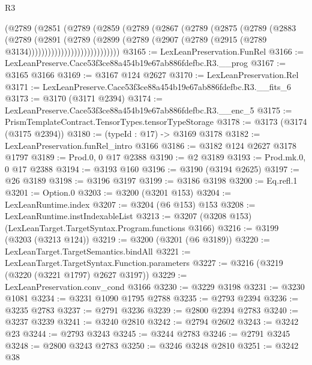 \begin{lexlean}{R3}
\begin{coremodule}
                      (@2789
                        (@2851
                          (@2789
                            (@2859
                              (@2789
                                (@2867
                                  (@2789
                                    (@2875
                                      (@2789
                                        (@2883
                                          (@2789
                                            (@2891
                                              (@2789
                                                (@2899
                                                  (@2789
                                                    (@2907
                                                      (@2789
                                                        (@2915
                                                          (@2789 @3134))))))))))))))))))))))))))))
@3165 := LexLeanPreservation.FunRel
@3166 := LexLeanPreserve.Cace53f3ce88a454b19e67ab886fdefbc.R3.__prog
@3167 := @3165 @3166
@3169 := @3167 @124 @2627
@3170 := LexLeanPreservation.Rel
@3171 := LexLeanPreserve.Cace53f3ce88a454b19e67ab886fdefbc.R3.__fits_6
@3173 := @3170 (@3171 @2394)
@3174 := LexLeanPreserve.Cace53f3ce88a454b19e67ab886fdefbc.R3.__enc_5
@3175 := PrismTemplateContract.TensorTypes.tensorTypeStorage
@3178 := @3173 (@3174 (@3175 @2394))
@3180 := (typeId : @17) -> @3169 @3178
@3182 := LexLeanPreservation.funRel_intro @3166
@3186 := @3182 @124 @2627 @3178 @1797
@3189 := Prod.{0, 0} @17 @2388
@3190 := @2 @3189
@3193 := Prod.mk.{0, 0} @17 @2388
@3194 := @3193 @160
@3196 := @3190 (@3194 @2625)
@3197 := @26 @3189
@3198 := @3196 @3197
@3199 := @3186 @3198
@3200 := Eq.refl.{1}
@3201 := Option.{0}
@3203 := @3200 (@3201 @153)
@3204 := LexLeanRuntime.index
@3207 := @3204 (@6 @153) @153
@3208 := LexLeanRuntime.instIndexableList
@3213 := @3207 (@3208 @153) (LexLeanTarget.TargetSyntax.Program.functions @3166)
@3216 := @3199 (@3203 (@3213 @124))
@3219 := @3200 (@3201 (@6 @3189))
@3220 := LexLeanTarget.TargetSemantics.bindAll
@3221 := LexLeanTarget.TargetSyntax.Function.parameters
@3227 := @3216 (@3219 (@3220 (@3221 @1797) @2627 @3197))
@3229 := LexLeanPreservation.conv_cond @3166
@3230 := @3229 @3198
@3231 := @3230 @1081
@3234 := @3231 @1090 @1795 @2788
@3235 := @2793 @2394
@3236 := @3235 @2783
@3237 := @2791 @3236
@3239 := @2800 @2394 @2783
@3240 := @3237 @3239
@3241 := @3240 @2810
@3242 := @2794 @2602
@3243 := @3242 @23
@3244 := @2793 @3243
@3245 := @3244 @2783
@3246 := @2791 @3245
@3248 := @2800 @3243 @2783
@3250 := @3246 @3248 @2810
@3251 := @3242 @38

\end{coremodule}
\end{lexlean}

